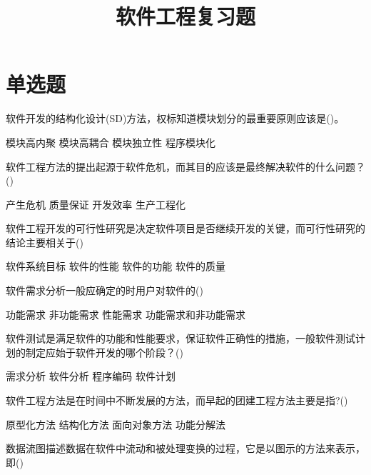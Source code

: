 \documentclass[answer]{exam}
\title{软件工程复习题}
\author{}
\date{}
\begin{document}
\maketitle
\section{单选题}
\begin{questions}
	\question 软件开发的结构化设计(SD)方法，权标知道模块划分的最重要原则应该是()。\\
	\begin{oneparchoices}
		\choice 模块高内聚
		\choice 模块高耦合
		\choice 模块独立性
		\choice 程序模块化
	\end{oneparchoices}
	\question 软件工程方法的提出起源于软件危机，而其目的应该是最终解决软件的什么问题？()\\
	\begin{oneparchoices}
		\choice 产生危机
		\choice 质量保证
		\choice 开发效率
		\choice 生产工程化
	\end{oneparchoices}
	\question 软件工程开发的可行性研究是决定软件项目是否继续开发的关键，而可行性研究的结论主要相关于()\\
	\begin{oneparchoices}
		\choice 软件系统目标
		\choice 软件的性能
		\choice 软件的功能
		\choice 软件的质量
	\end{oneparchoices}
	\question 软件需求分析一般应确定的时用户对软件的()\\
	\begin{oneparchoices}
		\choice 功能需求
		\choice 非功能需求
		\choice 性能需求
		\choice 功能需求和非功能需求
	\end{oneparchoices}
	\question 软件测试是满足软件的功能和性能要求，保证软件正确性的措施，一般软件测试计划的制定应始于软件开发的哪个阶段？()\\
	\begin{oneparchoices}
		\choice 需求分析
		\choice 软件分析
		\choice 程序编码
		\choice 软件计划
	\end{oneparchoices}
	\question 软件工程方法是在时间中不断发展的方法，而早起的团建工程方法主要是指?()\\
	\begin{oneparchoices}
		\choice 原型化方法
		\choice 结构化方法
		\choice 面向对象方法
		\choice 功能分解法
	\end{oneparchoices}
	\question 数据流图描述数据在软件中流动和被处理变换的过程，它是以图示的方法来表示，即()\\
	\begin{oneparchoices}

\end{oneparchoices}
\end{questions}
\end{document}
